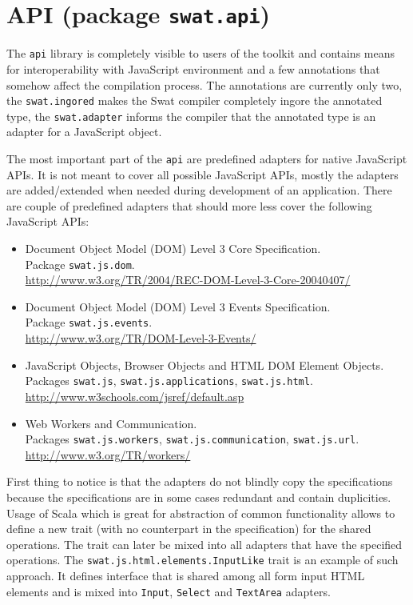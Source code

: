 \documentclass[12pt,a4paper]{report}
\begin{document}
\section{API (package \texttt{swat.api})}

The \texttt{api} library is completely visible to users of the toolkit and contains means for interoperability with JavaScript environment and a few annotations that somehow affect the compilation process. The annotations are currently only two, the \texttt{swat.ingored} makes the Swat compiler completely ingore the annotated type, the \texttt{swat.adapter} informs the compiler that the annotated type is an adapter for a JavaScript object.

The most important part of the \texttt{api} are predefined adapters for native JavaScript APIs. It is not meant to cover all possible JavaScript APIs, mostly the adapters are added/extended when needed during development of an application. There are couple of predefined adapters that should more less cover the following JavaScript APIs:

\begin{itemize}
\item Document Object Model (DOM) Level 3 Core Specification.\\
Package \texttt{swat.js.dom}.\\
\url{http://www.w3.org/TR/2004/REC-DOM-Level-3-Core-20040407/}
\item Document Object Model (DOM) Level 3 Events Specification.\\
Package \texttt{swat.js.events}.\\
\url{http://www.w3.org/TR/DOM-Level-3-Events/}
\item JavaScript Objects, Browser Objects and HTML DOM Element Objects.\\
Packages \texttt{swat.js}, \texttt{swat.js.applications}, \texttt{swat.js.html}.\\
\url{http://www.w3schools.com/jsref/default.asp}
\item Web Workers and Communication.\\
Packages \texttt{swat.js.workers}, \texttt{swat.js.communication}, \texttt{swat.js.url}.\\
\url{http://www.w3.org/TR/workers/}
\end{itemize}

First thing to notice is that the adapters do not blindly copy the specifications because the specifications are in some cases redundant and contain duplicities. Usage of Scala which is great for abstraction of common functionality allows to define a new trait (with no counterpart in the specification) for the shared operations. The trait can later be mixed into all adapters that have the specified operations. The \texttt{swat.js.html.elements.InputLike} trait is an example of such approach. It defines interface that is shared among all form input HTML elements and is mixed into \texttt{Input}, \texttt{Select} and \texttt{TextArea} adapters.
\end{document}
